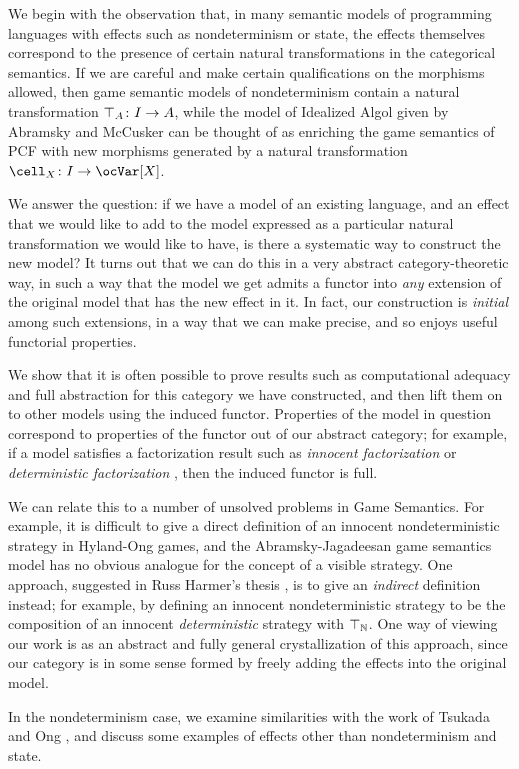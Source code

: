 \documentclass{article}
\begin{document}
We begin with the observation that, in many semantic models of programming languages with effects such as nondeterminism or state, the effects themselves correspond to the presence of certain natural transformations in the categorical semantics.  
If we are careful and make certain qualifications on the morphisms allowed, then game semantic models of nondeterminism contain a natural transformation $\top_A\colon I \to A$, while the model of Idealized Algol given by Abramsky and McCusker \cite{SamsonGuyIAPassive} can be thought of as enriching the game semantics of PCF with new morphisms generated by a natural transformation $\cell_X\from I \to \oc \Var[X]$.  

We answer the question: if we have a model of an existing language, and an effect that we would like to add to the model expressed as a particular natural transformation we would like to have, is there a systematic way to construct the new model?  It turns out that we can do this in a very abstract category-theoretic way, in such a way that the model we get admits a functor into \emph{any} extension of the original model that has the new effect in it.  
In fact, our construction is \emph{initial} among such extensions, in a way that we can make precise, and so enjoys useful functorial properties.  

We show that it is often possible to prove results such as computational adequacy and full abstraction for this category we have constructed, and then lift them on to other models using the induced functor.  
Properties of the model in question correspond to properties of the functor out of our abstract category; for example, if a model satisfies a factorization result such as \emph{innocent factorization} \cite{SamsonGuyIAPassive} or \emph{deterministic factorization} \cite{mcCHFiniteND}, then the induced functor is full.  

We can relate this to a number of unsolved problems in Game Semantics.  
For example, it is difficult to give a direct definition of an innocent nondeterministic strategy in Hyland-Ong games, and the Abramsky-Jagadeesan game semantics model has no obvious analogue for the concept of a visible strategy.  
One approach, suggested in Russ Harmer's thesis \cite{RusssThesis}, is to give an \emph{indirect} definition instead; for example, by defining an innocent nondeterministic strategy to be the composition of an innocent \emph{deterministic} strategy with $\top_{\mathbb{N}}$.  
One way of viewing our work is as an abstract and fully general crystallization of this approach, since our category is in some sense formed by freely adding the effects into the original model.  

In the nondeterminism case, we examine similarities with the work of Tsukada and Ong \cite{TsukadaSheaves}, and discuss some examples of effects other than nondeterminism and state.



\end{document}
